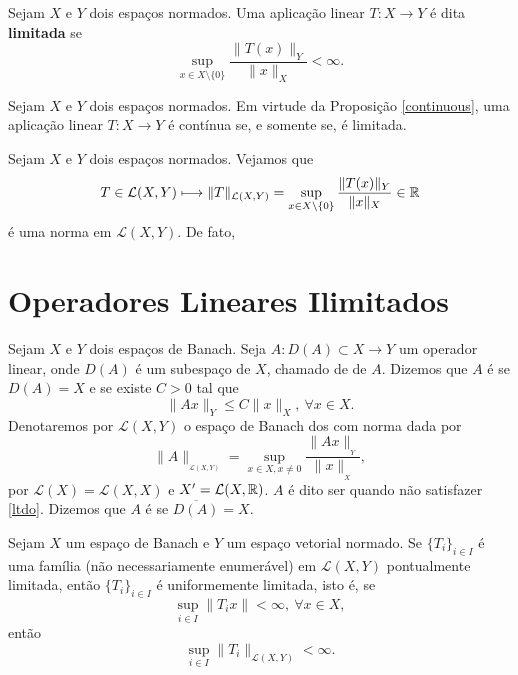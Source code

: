 \begin{definition}
Sejam $X$ e $Y$ dois espaços normados. Uma aplicação linear $T:X \longrightarrow Y$ é dita \textbf{limitada} se 
\[
\displaystyle \sup_{x\in X\setminus \{0\}} \frac{\|T(x)\|_Y}{\|x\|_X} <\infty.
\]
\end{definition}

\begin{remark}
Sejam $X$ e $Y$ dois espaços normados. Em virtude da Proposição \ref{continuous}, uma aplicação linear $T:X\longrightarrow Y$ é contínua se, e somente se, é limitada. 
\end{remark}

\begin{example}
Sejam $X$ e $Y$ dois espaços normados. Vejamos que 
\[
T\in \mathcal L (X,Y) \longmapsto \|T\|_{\mathcal L (X,Y)} = \sup_{x\in X\setminus \{0\}} \frac{\|T(x)\|_Y}{\|x\|_X} \in \mathbb{R}
\]
é uma norma em $\mathcal L (X,Y)$. De fato,
\end{example}



\section{Operadores Lineares Ilimitados}

Sejam $X$ e $Y$ dois espaços de Banach. Seja $A:D(A)\subset X\longrightarrow Y$ um operador linear,  onde $D(A)$ é um subespaço de $X$, chamado de  de $A$.
\medskip
Dizemos que $A$ é   se $D(A)=X$ e se existe  $C>0$ tal que 
\begin{equation}\label{ltdo}
\|Ax\|_{Y}\leq C\|x\|_X, \ \forall x\in X.
\end{equation}
Denotaremos por $\mathcal{L}(X,Y)$ o espaço de Banach dos  com norma dada por
\[\|A\|_{_{\mathcal{L}(X,Y)}}=\sup\limits_{x\in X, x\neq 0}\frac{\|Ax\|_{_Y}}{\|x\|_{_X}},\]
por $\mathcal{L}(X)=\mathcal{L}(X,X)$ e $X'=\mathcal{L}(X,\mathbb{R})$.
$A$ é dito ser   quando não satisfazer \eqref{ltdo}. Dizemos que $A$ é   se $\overline{D(A)}=X$.

\begin{theorem}\label{th-BS}
	Sejam $X$ um espaço de Banach e $Y$ um espaço vetorial normado. Se $\{T_i\}_{i\in I}$  é uma família (não necessariamente enumerável) em $\mathcal{L}(X,Y)$ pontualmente limitada, então $\{T_i\}_{i\in I}$ é uniformemente limitada, isto é, se 
	 \[\sup_{i\in I}\|T_ix\|< \infty,\ \forall x\in X,\] 
	 então
	 \[\sup_{i\in I}\|T_i\|_{\mathcal{L}(X,Y)}<\infty.\]
\end{theorem}

